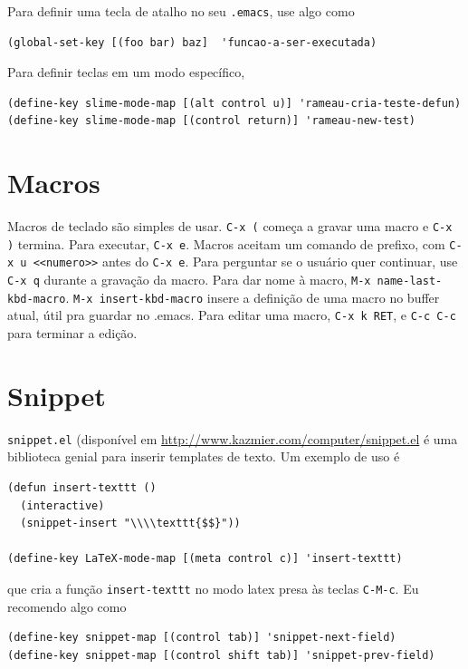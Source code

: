 \documentclass[12pt,brazil]{book}
\begin{document}
Para definir uma tecla de atalho no seu \texttt{.emacs}, use algo como

\begin{verbatim}
(global-set-key [(foo bar) baz]  'funcao-a-ser-executada)
\end{verbatim}

Para definir teclas em um modo específico,

\begin{verbatim}
(define-key slime-mode-map [(alt control u)] 'rameau-cria-teste-defun)
(define-key slime-mode-map [(control return)] 'rameau-new-test)
\end{verbatim}

\section{Macros}
\label{sec:macros}

Macros de teclado são simples de usar. \texttt{C-x (} começa a gravar
uma macro e \texttt{C-x )} termina. Para executar, \texttt{C-x
  e}. Macros aceitam um comando de prefixo, com \texttt{C-x u
  <<numero>>} antes do \texttt{C-x e}. Para perguntar se o usuário
quer continuar, use \texttt{C-x q} durante a gravação da macro. Para
dar nome à macro, \texttt{M-x name-last-kbd-macro}. \texttt{M-x
  insert-kbd-macro} insere a definição de uma macro no buffer atual,
útil pra guardar no .emacs. Para editar uma macro, \texttt{C-x k RET},
e \texttt{C-c C-c} para terminar a edição.

\section{Snippet}
\label{sec:snippet}

\texttt{snippet.el} (disponível em
\url{http://www.kazmier.com/computer/snippet.el} é uma biblioteca
genial para inserir templates de texto. Um exemplo de uso é

\begin{verbatim}
(defun insert-texttt ()
  (interactive)
  (snippet-insert "\\\\texttt{$$}"))

(define-key LaTeX-mode-map [(meta control c)] 'insert-texttt)

\end{verbatim}

que cria a função \texttt{insert-texttt} no modo latex presa às teclas
\texttt{C-M-c}. Eu recomendo algo como

\begin{verbatim}
(define-key snippet-map [(control tab)] 'snippet-next-field)
(define-key snippet-map [(control shift tab)] 'snippet-prev-field)
\end{verbatim}
\end{document}
